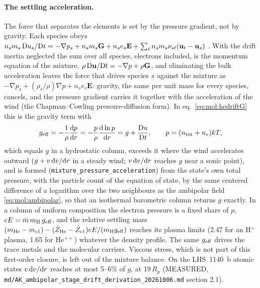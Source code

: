 \paragraph{The settling acceleration.}
The force that separates the elements is set by the pressure gradient, not by
gravity. Each species obeys
$n_sm_s\,{\rm D}u_s/{\rm D}t = -\nabla p_s + n_sm_s\mathbf{G} + n_se_s\mathbf{E}
+ \sum_t n_sm_s\nu_{st}(\mathbf{u}_t-\mathbf{u}_s)$ \citep[eq.~24b]{Schunk1977}.
With the drift inertia neglected the sum over all species, electrons included,
is the momentum equation of the mixture,
$\rho\,{\rm D}\mathbf{u}/{\rm D}t = -\nabla p + \rho\mathbf{G}$, and
eliminating the bulk acceleration leaves the force that drives species $s$
against the mixture as $-\nabla p_s + (\rho_s/\rho)\nabla p + n_se_s\mathbf{E}$:
gravity, the same per unit mass for every species, cancels, and the pressure
gradient carries it together with the acceleration of the wind (the
Chapman--Cowling pressure-diffusion form). In eq.~\eqref{eq:mol:hedriftG}
this is the gravity term with
\begin{equation}
g_{\rm eff} = -\frac{1}{\rho}\frac{{\rm d}p}{{\rm d}r}
            = -\frac{p}{\rho}\frac{{\rm d}\ln p}{{\rm d}r}
            = g + \frac{{\rm D}u}{{\rm D}t},
\qquad p = (n_{\rm tot}+n_e)kT,
\label{eq:mol:geff}
\end{equation}
which equals $g$ in a hydrostatic column, exceeds it where the wind
accelerates outward ($g + v\,{\rm d}v/{\rm d}r$ in a steady wind; $v\,{\rm
d}v/{\rm d}r$ reaches $g$ near a sonic point), and is formed
(\texttt{mixture\_pressure\_acceleration}) from the state's own total pressure,
with the particle count of the equation of state, by the same centered
difference of a logarithm over the two neighbours as the ambipolar field
\eqref{eq:mol:ambipolar}, so that an isothermal barometric column returns $g$
exactly. In a column of uniform composition the electron pressure is a fixed
share of $p$, $eE = \bar m\,m_{\rm H}\,g_{\rm eff}$, and the relative settling
mass $(m_{\rm He}-m_{c1}) - (\bar Z_{\rm He}-\bar Z_{c1})eE/(m_{\rm H}g_{\rm eff})$
reaches its plasma limits (2.47 for an H$^+$ plasma, 1.65 for He$^{++}$)
whatever the density profile. The same $g_{\rm eff}$ drives the trace metals
and the molecular carriers. Viscous stress, which is not part of this
first-order closure, is left out of the mixture balance. On the LHS~1140~b
atomic states $v\,{\rm d}v/{\rm d}r$ reaches at most 5--6\% of $g$, at
19\,$R_p$ (MEASURED,
\texttt{md/AK\_ambipolar\_stage\_drift\_derivation\_20261006.md} section 2.1).

